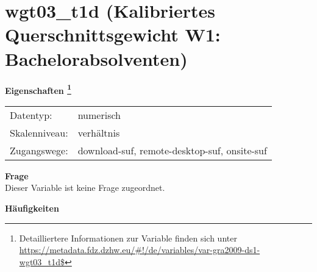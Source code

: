 
    \setcounter{footnote}{0}

    \vspace*{-1.8cm}
	\section{wgt03\_t1d (Kalibriertes Querschnittsgewicht W1: Bachelorabsolventen)}
	\label{section:wgt03_t1d}



    \vspace*{0.5cm}
    \noindent\textbf{Eigenschaften
	\footnote{Detailliertere Informationen zur Variable finden sich unter
		\url{https://metadata.fdz.dzhw.eu/\#!/de/variables/var-gra2009-ds1-wgt03_t1d$}}}\\
	\begin{tabularx}{\hsize}{@{}lX}
	Datentyp: & numerisch \\
	Skalenniveau: & verhältnis \\
	Zugangswege: &
	  download-suf, 
	  remote-desktop-suf, 
	  onsite-suf
 \\
    \end{tabularx}



		\vspace*{0.5cm}
		\noindent\textbf{Frage}\\
		Dieser Variable ist keine Frage zugeordnet.





        		\vspace*{0.5cm}
                \noindent\textbf{Häufigkeiten}


